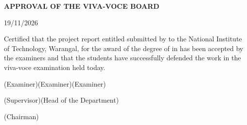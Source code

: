 \clearpage
\setcounter{page}{2}
\thispagestyle{plain}
\begin{center}
\textbf{APPROVAL OF THE VIVA-VOCE BOARD}
\end{center}
\vspace{4mm}
\hfill 19/11/2026

\vspace{6mm}
{\sloppy
Certified that the project report entitled \MakeUppercase{\ProjectTitle} submitted by
{\renewcommand{\Student}[2]{\StudentSep\MakeUppercase{#1} (#2)\def\StudentSep{, }}\def\StudentSep{}\StudentList}
to the National Institute of Technology, Warangal, for the award of the degree of
\Degree{} in \Program{} has been accepted by the examiners and that the students have
successfully defended the work in the viva-voce examination held today.\par}

\vspace{30mm}
\noindent(Examiner)\hfill(Examiner)\hfill(Examiner)

\vspace{30mm}
\noindent(Supervisor)\hfill(Head of the Department)

\vspace{30mm}
\noindent\hfill(Chairman)
